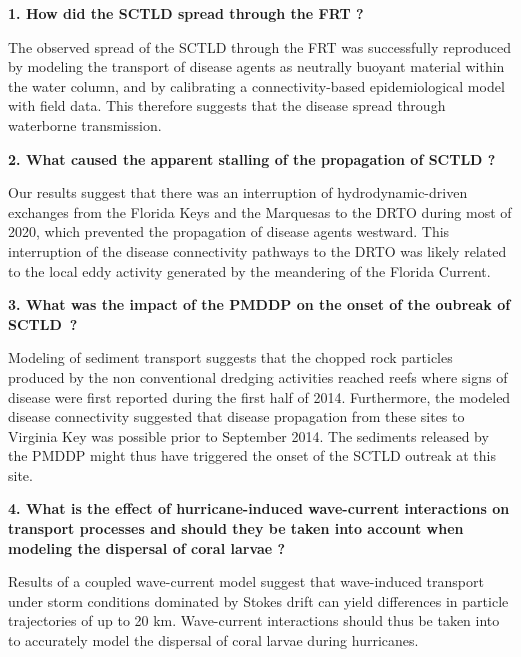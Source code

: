 \begin{list}{}{%
    \setlength{\leftmargin}{0in}%
    }
    \item \textbf{1. How did the SCTLD spread through the FRT ?}
    \begin{list}{}{\setlength{\topsep}{0pt}}
        \item The observed spread of the SCTLD through the FRT was successfully reproduced by modeling the transport of disease agents as neutrally buoyant material within the water column, and by calibrating a connectivity-based epidemiological model with field data. This therefore suggests that the disease spread through waterborne transmission. 
    \end{list}
    \item \textbf{2. What caused the apparent stalling of the propagation of SCTLD ?}
    \begin{list}{}{\setlength{\topsep}{0pt}}
        \item Our results suggest that there was an interruption of hydrodynamic-driven exchanges from the Florida Keys and the Marquesas to the DRTO during most of 2020, which prevented the propagation of disease agents westward. This interruption of the disease connectivity pathways to the DRTO was likely related to the local eddy activity generated by the meandering of the Florida Current.
    \end{list}
    \item \textbf{3. What was the impact of the PMDDP on the onset of the oubreak of SCTLD~?}
    \begin{list}{}{\setlength{\topsep}{0pt}}
        \item Modeling of sediment transport suggests that the chopped rock particles produced by the non conventional dredging activities reached reefs where signs of disease were first reported during the first half of 2014. Furthermore, the modeled disease connectivity suggested that disease propagation from these sites to Virginia Key was possible prior to September 2014. The sediments released by the PMDDP might thus have triggered the onset of the SCTLD outreak at this site.
    \end{list}
    \item  \textbf{4. What is the effect of hurricane-induced wave-current interactions on transport processes and should they be taken into account when modeling the dispersal of coral larvae ?}
    \begin{list}{}{\setlength{\topsep}{0pt}}
        \item Results of a coupled wave-current model suggest that wave-induced transport under storm conditions dominated by Stokes drift can yield differences in particle trajectories of up to 20 km. Wave-current interactions should thus be taken into to accurately model the dispersal of coral larvae during hurricanes.
    \end{list}
\end{list}


